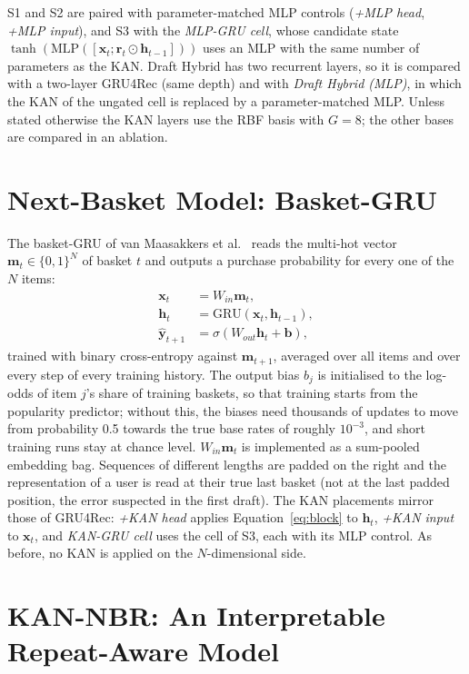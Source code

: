 \documentclass[12pt,a4paper]{report}
\begin{document}
S1 and S2 are paired with parameter-matched MLP controls (\emph{+MLP head},
\emph{+MLP input}), and S3 with the \emph{MLP-GRU cell}, whose candidate state
$\tanh(\mathrm{MLP}([\mathbf{x}_t; \mathbf{r}_t \odot \mathbf{h}_{t-1}]))$ uses an MLP with
the same number of parameters as the KAN. Draft Hybrid has two recurrent layers,
so it is compared with a two-layer GRU4Rec (same depth) and with \emph{Draft
Hybrid (MLP)}, in which the KAN of the ungated cell is replaced by a
parameter-matched MLP. Unless stated otherwise the KAN layers use the RBF basis
with $G=8$; the other bases are compared in an ablation.

\section{Next-Basket Model: Basket-GRU}

The basket-GRU of van Maasakkers et al.\ \cite{vanmaasakkers2023} reads the
multi-hot vector $\mathbf{m}_t \in \{0,1\}^N$ of basket $t$ and outputs a purchase
probability for every one of the $N$ items:
\begin{align}
\mathbf{x}_t &= W_{in}\mathbf{m}_t, \\
\mathbf{h}_t &= \mathrm{GRU}(\mathbf{x}_t, \mathbf{h}_{t-1}), \\
\hat{\mathbf{y}}_{t+1} &= \sigma(W_{out}\mathbf{h}_t + \mathbf{b}),
\end{align}
trained with binary cross-entropy against $\mathbf{m}_{t+1}$, averaged over all
items and over every step of every training history. The output bias $b_j$ is
initialised to the log-odds of item $j$'s share of training baskets, so that
training starts from the popularity predictor; without this, the biases need
thousands of updates to move from probability 0.5 towards the true base rates
of roughly $10^{-3}$, and short training runs stay at chance level. $W_{in}\mathbf{m}_t$ is
implemented as a sum-pooled embedding bag. Sequences of different lengths are
padded on the right and the representation of a user is read at their true last
basket (not at the last padded position, the error suspected in the first draft).
The KAN placements mirror those of GRU4Rec: \emph{+KAN head} applies
Equation~\eqref{eq:block} to $\mathbf{h}_t$, \emph{+KAN input} to $\mathbf{x}_t$,
and \emph{KAN-GRU cell} uses the cell of S3, each with its MLP control. As before, no KAN is applied on the
$N$-dimensional side.

\section{KAN-NBR: An Interpretable Repeat-Aware Model}
\label{sec:kannbr}
\end{document}
